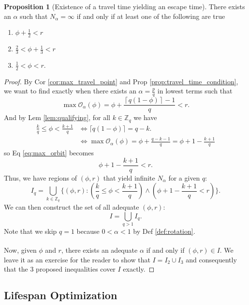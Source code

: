\documentclass{article}
\theoremstyle{definition}
\newtheorem{proposition}{Proposition}[section]
\newcommand{\onRatio}{ r }
\newcommand{\travelTime}{ \alpha }
\newcommand{\phase}{ \phi }
\newcommand{\fatalIndex}[1]{N_#1}
\newcommand{\orbit}[2]{ \mathcal{O}_#1(#2) }
\begin{document}
\begin{proposition}[Existence of a travel time yielding an escape time] There exists an $\travelTime$ such that $\fatalIndex{\travelTime} = \infty$ if and only if at least one of the following are true
\begin{enumerate}
    \item $\phase+\frac{1}{2}<\onRatio$
    \item $\frac{2}{3}<\phase+\frac{1}{3}<\onRatio$
    \item $\frac{1}{2}<\phase<\onRatio$.
\end{enumerate}
\begin{proof}
    By Cor \ref{cor:max_travel_point} and Prop \ref{prop:travel_time_condition}, we want to find exactly when there exists an $\travelTime=\frac{p}{q}$ in lowest terms such that
\begin{equation}
\label{eq:max_orbit}
    \max\orbit{\travelTime}{\phase} = \phase + \frac{\left\lceil q(1-\phase) \right\rceil - 1}{q} < \onRatio.
\end{equation}
And by Lem \ref{lem:qualifying}, for all $k\in\mathbb{Z}_q$ we have
\begin{align*}
\frac{k}{q}\le\phase<\frac{k+1}{q} & \iff \lceil q(1-\phase)\rceil=q-k.\\
&\iff \max\orbit{\travelTime}{\phase} = \phase + \frac{q-k - 1}{q} = \phase + 1-\frac{k + 1}{q}
\end{align*}
so Eq \ref{eq:max_orbit} becomes
\[
\phase + 1-\frac{k + 1}{q} < \onRatio.
\]
Thus, we have regions of $(\phase,\onRatio)$ that yield infinite $\fatalIndex{\travelTime}$ for a given $q$:
\[
I_q=\bigcup_{k \in \mathbb{Z}_q}\biggl\{(\phase,\onRatio): \left(\frac{k}{q}\le\phase<\frac{k+1}{q}\right) \land \left(\phase + 1-\frac{k + 1}{q} < \onRatio\right)\biggr\}.
\]
We can then construct the set of all adequate $(\phase,\onRatio)$:
\[
I=\bigcup_{q >1} I_q.
\]
Note that we skip $q=1$ because $0<\travelTime<1$ by Def \ref{def:rotation}.
\\
\\
Now, given $\phase$ and $\onRatio$, there exists an adequate $\travelTime$ if and only if  $(\phase,\onRatio) \in I$. We leave it as an exercise for the reader to show that $I=I_2\cup I_3$ and consequently that the 3 proposed inequalities cover $I$ exactly.
\end{proof}
\end{proposition}

\subsection{Lifespan Optimization}
\end{document}
